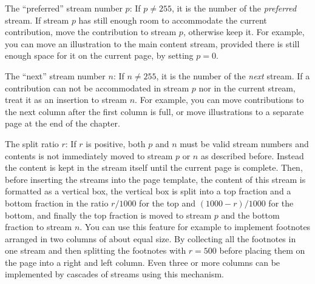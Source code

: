 \item The ``preferred'' stream number $p$:  If $p\ne 255$, it is the number of
the {\it preferred\/} stream. If stream $p$ has still
enough room to accommodate the current contribution, move the
contribution to stream $p$, otherwise keep it.  For example, you can
move an illustration to the main content stream, provided there is
still enough space for it on the current page, by setting $p=0$.

\item The ``next'' stream number $n$: If $n\ne 255$, it is the number of the
{\it next\/} stream. If a contribution can not be
accommodated in stream $p$ nor in the current stream, treat it as an
insertion to stream $n$.  For example, you can move contributions to
the next column after the first column is full, or move illustrations
to a separate page at the end of the chapter.

\item The split ratio $r$: If $r$ is positive, both $p$ and $n$ must
be valid stream numbers and contents is not immediately moved to stream $p$ or $n$ as described before.
Instead the content is kept in the stream itself until the current page is complete.
Then, before inserting the streams into the page template, the content of
this stream is formatted as a vertical box, the vertical box is
split into a top fraction and a bottom fraction in the ratio $r/1000$
for the top and $(1000-r)/1000$ for the bottom, and finally the top
fraction is moved to stream $p$ and the bottom fraction to stream
$n$. You can use this feature for example to implement footnotes
arranged in two columns of about equal size. By collecting all the
footnotes in one stream and then splitting the footnotes with $r=500$
before placing them on the page into a right and left column.  Even
three or more columns can be implemented by cascades of streams using
this mechanism.
\enditemize

